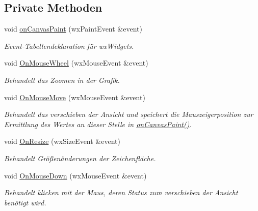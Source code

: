 \subsection*{Private Methoden}
\begin{DoxyCompactItemize}
\item 
void \hyperlink{classGUIRenderCutCanvas_a348424f671910f6ede43cb6835852589}{on\-Canvas\-Paint} (wx\-Paint\-Event \&event)
\begin{DoxyCompactList}\small\item\em Event-\/\-Tabellendeklaration für wx\-Widgets. \end{DoxyCompactList}\item 
void \hyperlink{classGUIRenderCutCanvas_a6759782fb854d7be47f368974c57b4e1}{On\-Mouse\-Wheel} (wx\-Mouse\-Event \&event)
\begin{DoxyCompactList}\small\item\em Behandelt das Zoomen in der Grafik. \end{DoxyCompactList}\item 
void \hyperlink{classGUIRenderCutCanvas_a5d4aa229d86929fe6f6a73fe05ab32ad}{On\-Mouse\-Move} (wx\-Mouse\-Event \&event)
\begin{DoxyCompactList}\small\item\em Behandelt das verschieben der Ansicht und speichert die Mauszeigerposition zur Ermittlung des Wertes an dieser Stelle in \hyperlink{classGUIRenderCutCanvas_a348424f671910f6ede43cb6835852589}{on\-Canvas\-Paint()}. \end{DoxyCompactList}\item 
void \hyperlink{classGUIRenderCutCanvas_a60ff460dd2c800b71802133f56d5b355}{On\-Resize} (wx\-Size\-Event \&event)
\begin{DoxyCompactList}\small\item\em Behandelt Größenänderungen der Zeichenfläche. \end{DoxyCompactList}\item 
void \hyperlink{classGUIRenderCutCanvas_a42f81a939b256a87e76b3896fc0b9ce3}{On\-Mouse\-Down} (wx\-Mouse\-Event \&event)
\begin{DoxyCompactList}\small\item\em Behandelt klicken mit der Maus, deren Status zum verschieben der Ansicht benötigt wird. \end{DoxyCompactList}\end{DoxyCompactItemize}
